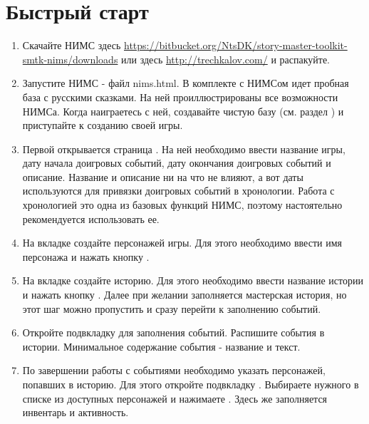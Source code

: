 \documentclass[a4paper,oneside,10pt,russian]{sphinxmanual}
\begin{document}
\chapter{Быстрый старт}
\label{quickStart::doc}\label{quickStart:id1}\begin{enumerate}
\item {}
Скачайте НИМС здесь \href{https://bitbucket.org/NtsDK/story-master-toolkit-smtk-nims/downloads}{https://bitbucket.org/NtsDK/story-master-toolkit-smtk-nims/downloads} или здесь \href{http://trechkalov.com/}{http://trechkalov.com/} и распакуйте.

\item {}
Запустите НИМС - файл nims.html. В комплекте с НИМСом идет пробная база с русскими сказками. На ней проиллюстрированы все возможности НИМСа. Когда наиграетесь с ней, создавайте чистую базу (см. раздел {\hyperref[pages:header-desc]{\emph{}}}) и приступайте к созданию своей игры.

\item {}
Первой открывается страница {\hyperref[pages:overview-desc]{\emph{}}}. На ней необходимо ввести название игры, дату начала доигровых событий, дату окончания доигровых событий и описание. Название и описание ни на что не влияют, а вот даты используются для привязки доигровых событий в хронологии. Работа с хронологией это одна из базовых функций НИМС, поэтому настоятельно рекомендуется использовать ее.

\item {}
На вкладке {\hyperref[pages:characters-desc]{\emph{}}} создайте персонажей игры. Для этого необходимо ввести имя персонажа и нажать кнопку .

\item {}
На вкладке {\hyperref[pages:story-desc]{\emph{}}} создайте историю. Для этого необходимо ввести название истории и нажать кнопку . Далее при желании заполняется мастерская история, но этот шаг можно пропустить и сразу перейти к заполнению событий.

\item {}
Откройте подвкладку {\hyperref[pages:story-events]{\emph{}}} для заполнения событий. Распишите события в истории. Минимальное содержание события - название и текст.

\item {}
По завершении работы с событиями необходимо указать персонажей, попавших в историю. Для этого откройте подвкладку {\hyperref[pages:story-characters]{\emph{}}}. Выбираете нужного в списке из доступных персонажей и нажимаете . Здесь же заполняется инвентарь и активность.


\end{enumerate}
\end{document}
